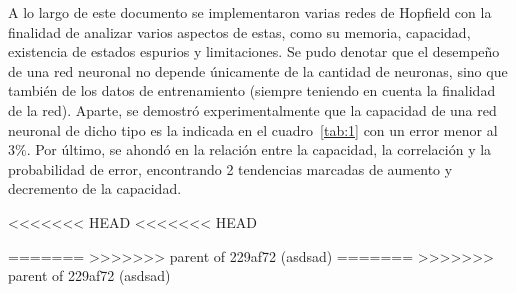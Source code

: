 \documentclass[11pt]{article} %
\begin{document}
A lo largo de este documento se implementaron varias redes de Hopfield con la finalidad de analizar varios aspectos de estas, como su memoria, capacidad, existencia de estados espurios y limitaciones. Se pudo denotar que el desempeño de una red neuronal no depende únicamente de la cantidad de neuronas, sino que también de los datos de entrenamiento (siempre teniendo en cuenta la finalidad de la red). Aparte, se demostró experimentalmente que la capacidad de una red neuronal de dicho tipo es la indicada en el cuadro~\ref{tab:1} con un error menor al $3\%$. Por último, se ahondó en la relación entre la capacidad, la correlación y la probabilidad de error, encontrando 2 tendencias marcadas de aumento y decremento de la capacidad. 

<<<<<<< HEAD
<<<<<<< HEAD

=======
>>>>>>> parent of 229af72 (asdsad)
=======
>>>>>>> parent of 229af72 (asdsad)
\end{document}
